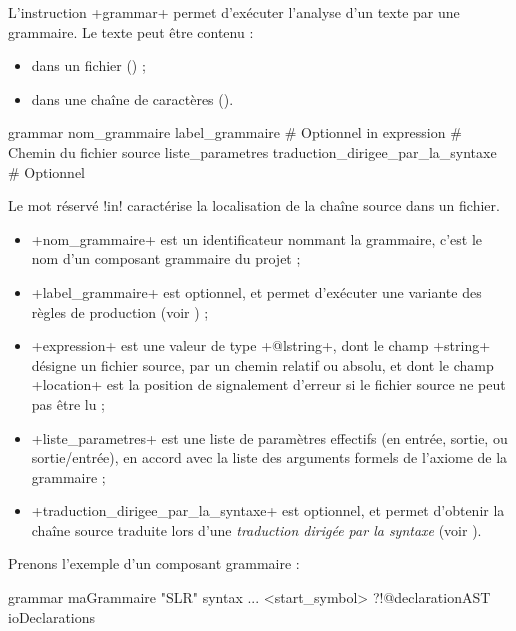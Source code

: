 
L'instruction \ggs+grammar+ permet d'exécuter l'analyse d'un texte par une grammaire. Le texte peut être contenu :
\begin{itemize}
  \item dans un fichier () ;
  \item dans une chaîne de caractères ().
\end{itemize}







\begin{galgasbox}
grammar
  nom_grammaire
  label_grammaire # Optionnel
  in expression # Chemin du fichier source
  liste_parametres
  traduction_dirigee_par_la_syntaxe # Optionnel
\end{galgasbox}

Le mot réservé \ggs!in! caractérise la localisation de la chaîne source dans un fichier.
\begin{itemize}
  \item \ggs+nom_grammaire+ est un identificateur nommant la grammaire, c'est le nom d'un composant grammaire du projet ;
  \item \ggs+label_grammaire+ est optionnel, et permet d'exécuter une variante des règles de production (voir ) ;
  \item \ggs+expression+ est une valeur de type \ggs+@lstring+, dont le champ \ggs+string+ désigne un fichier source, par un chemin relatif ou absolu, et dont le champ \ggs+location+ est la position de signalement d'erreur si le fichier source ne peut pas être lu ;
  \item \ggs+liste_parametres+ est une liste de paramètres effectifs (en entrée, sortie, ou sortie/entrée), en accord avec la liste des arguments formels de l'axiome de la grammaire ;
  \item \ggs+traduction_dirigee_par_la_syntaxe+ est optionnel, et permet d'obtenir la chaîne source traduite lors d'une \emph{traduction dirigée par la syntaxe} (voir ).
\end{itemize}

Prenons l'exemple d'un composant grammaire :
\begin{galgas}
grammar maGrammaire "SLR" {
  syntax ...
   <start_symbol> ?!@declarationAST ioDeclarations
}
\end{galgas}


